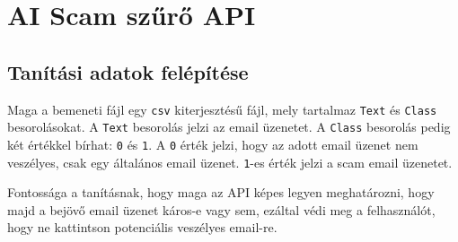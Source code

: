 ﻿\chapter{AI Scam szűrő API}

\section{Tanítási adatok felépítése}
\begin{flushleft}
    Maga a bemeneti fájl egy \verb|csv| kiterjesztésű fájl, mely tartalmaz \verb|Text| és \verb|Class| besorolásokat. A \verb|Text| besorolás jelzi az email üzenetet. A \verb|Class| besorolás pedig két értékkel bírhat: \verb|0| és \verb|1|. A \verb|0| érték jelzi, hogy az adott email üzenet nem veszélyes, csak egy általános email üzenet. \verb|1|-es érték jelzi a scam email üzenetet.
\end{flushleft}

\begin{flushleft}
    Fontossága a tanításnak, hogy maga az API képes legyen meghatározni, hogy majd a bejövő email üzenet káros-e vagy sem, ezáltal védi meg a felhasználót, hogy ne kattintson potenciális veszélyes email-re.
\end{flushleft}

